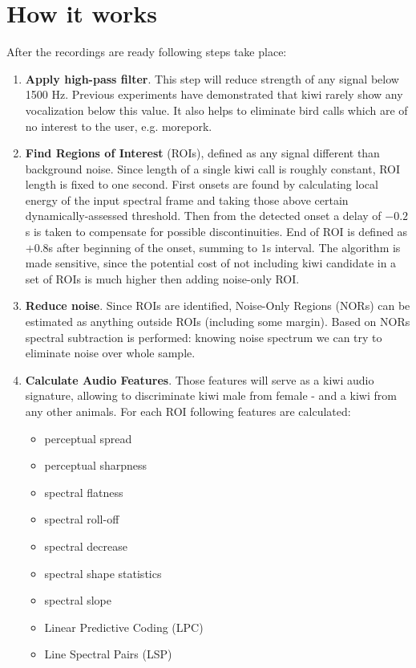 \documentclass[paper=a4, fontsize=11pt]{scrartcl}	%
\numberwithin{equation}{section}		%
\numberwithin{figure}{section}			%
\numberwithin{table}{section}				%
\begin{document}
\section{How it works}
After the recordings are ready following steps take place:
\begin{enumerate}
	\item \textbf{Apply high-pass filter}. This step will reduce strength of any signal below 1500 Hz. Previous experiments have demonstrated that kiwi rarely show any vocalization below this value. It also helps to eliminate bird calls which are of no interest to the user, e.g. morepork.
	\item \textbf{Find Regions of Interest} (ROIs), defined as any signal different than background noise. Since length of a single kiwi call is roughly constant, ROI length is fixed to one second. First onsets are found by calculating local energy of the input spectral frame and taking those above certain dynamically-assessed threshold. Then from the detected onset a delay of $-0.2$s is taken to compensate for possible discontinuities. End of ROI is defined as $+0.8$s after beginning of the onset, summing to $1$s interval. The algorithm is made sensitive, since the potential cost of not including kiwi candidate in a set of ROIs is much higher then adding noise-only ROI.
	\item \textbf{Reduce noise}. Since ROIs are identified, Noise-Only Regions (NORs) can be estimated as anything outside ROIs (including some margin). Based on NORs spectral subtraction is performed: knowing noise spectrum we can try to eliminate noise over whole sample.
	\item \textbf{Calculate Audio Features}. Those features will serve as a kiwi audio signature, allowing to discriminate kiwi male from female - and a kiwi from any other animals. For each ROI following features are calculated:
	\begin{itemize}
		\item perceptual spread
		\item perceptual sharpness
		\item spectral flatness
		\item spectral roll-off
		\item spectral decrease
		\item spectral shape statistics
		\item spectral slope
		\item Linear Predictive Coding (LPC)
		\item Line Spectral Pairs (LSP)

\end{itemize}
\end{enumerate}
\end{document}
